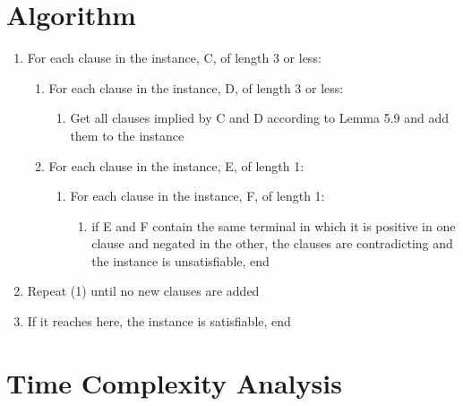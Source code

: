 \documentclass[manuscript]{acmart}
\begin{document}


    \section{Algorithm}

    \begin{enumerate}
        \item For each clause in the instance, C, of length 3 or less:
        \begin{enumerate}
            \item For each clause in the instance, D, of length 3 or less:
            \begin{enumerate}
                \item Get all clauses implied by C and D according to Lemma 5.9 
                and add them to the instance
            \end{enumerate}
            \item For each clause in the instance, E, of length 1:
            \begin{enumerate}
                \item For each clause in the instance, F, of length 1:
                \begin{enumerate}
                    \item if E and F contain the same terminal in which it is 
                    positive in one clause and negated in the other, the 
                    clauses are contradicting and the instance is unsatisfiable, end
                \end{enumerate}
            \end{enumerate}
        \end{enumerate}
        \item Repeat (1) until no new clauses are added
        \item If it reaches here, the instance is satisfiable, end
    \end{enumerate}

    \section{Time Complexity Analysis}
\end{document}
